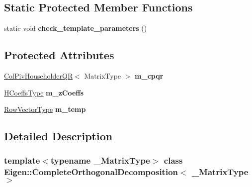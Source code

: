 \subsection*{Static Protected Member Functions}
\begin{DoxyCompactItemize}
\item 
\mbox{\label{class_eigen_1_1_complete_orthogonal_decomposition_a5e066e98d76f6bb2231f16676d18c877}} 
static void {\bfseries check\+\_\+template\+\_\+parameters} ()
\end{DoxyCompactItemize}
\subsection*{Protected Attributes}
\begin{DoxyCompactItemize}
\item 
\mbox{\label{class_eigen_1_1_complete_orthogonal_decomposition_a7e53f3ce1fc2d8244a64c18855ab2641}} 
\mbox{\hyperlink{class_eigen_1_1_col_piv_householder_q_r}{Col\+Piv\+Householder\+QR}}$<$ Matrix\+Type $>$ {\bfseries m\+\_\+cpqr}
\item 
\mbox{\label{class_eigen_1_1_complete_orthogonal_decomposition_a84daf778398c92d7c0856564069897b4}} 
\mbox{\hyperlink{struct_eigen_1_1internal_1_1true__type}{H\+Coeffs\+Type}} {\bfseries m\+\_\+z\+Coeffs}
\item 
\mbox{\label{class_eigen_1_1_complete_orthogonal_decomposition_a953bdfff5e3e3bdeeb3263b83eef4475}} 
\mbox{\hyperlink{struct_eigen_1_1internal_1_1true__type}{Row\+Vector\+Type}} {\bfseries m\+\_\+temp}
\end{DoxyCompactItemize}


\subsection{Detailed Description}
\subsubsection*{template$<$typename \+\_\+\+Matrix\+Type$>$\newline
class Eigen\+::\+Complete\+Orthogonal\+Decomposition$<$ \+\_\+\+Matrix\+Type $>$}

